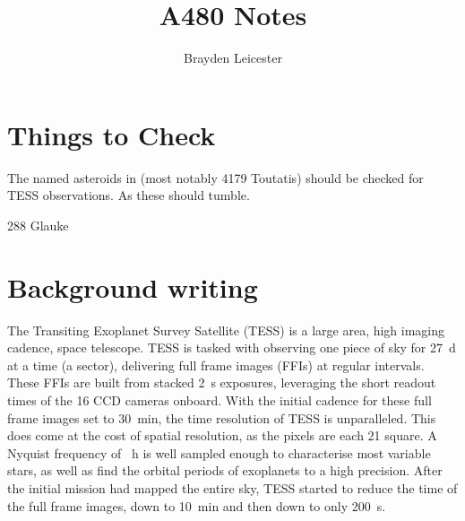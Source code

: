 \documentclass[12pt]{article}
\title{A480 Notes}
\author{Brayden Leicester}
\begin{document}
\maketitle

\section{Things to Check}
The named asteroids in \cite{Harris1994} (most notably 4179 Toutatis) should be checked for TESS observations. As these should tumble.

288 Glauke \cite{Harris2015}

\section{Background writing}

The Transiting Exoplanet Survey Satellite (TESS) \cite{Ricker2014} is a large area, high imaging cadence, space telescope. 
TESS is tasked with observing one piece of sky for \qty{27}{\day} at a time (a sector), delivering  full frame images (FFIs) at regular intervals. 
These FFIs are built from stacked \qty{2}{\second} exposures, leveraging the short readout times of the 16 CCD cameras onboard. 
With the initial cadence for these full frame images set to \qty{30}{\minute}, the time resolution of TESS is unparalleled. 
This does come at the cost of spatial resolution, as the pixels are each \qty{21}{\arcsec} square. 
A Nyquist frequency of \unit{\per\hour} is well sampled enough to characterise most variable stars, as well as find the orbital periods of exoplanets to a high precision. 
After the initial mission had mapped the entire sky, TESS started to reduce the time of the full frame images, down to \qty{10}{\minute} and then down to only \qty{200}{\second}.
\end{document}
